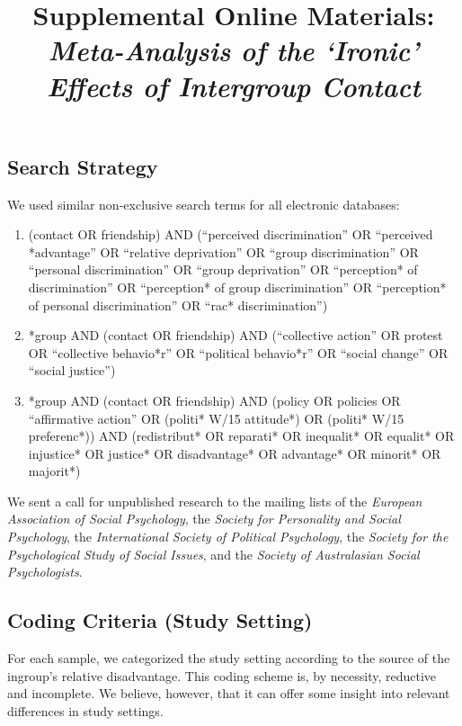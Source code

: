 \documentclass[12pt, letterpaper]{article}
\title{ Supplemental Online Materials:\\\textit{Meta-Analysis of the
`Ironic' Effects of Intergroup Contact} }
\author{  }
\begin{document}
\maketitle

\hypertarget{search-strategy}{%
\subsection{Search Strategy}\label{search-strategy}}

We used similar non-exclusive search terms for all electronic databases:

\begin{enumerate}
\def\labelenumi{\arabic{enumi}.}
\item
  (contact OR friendship) AND (``perceived discrimination'' OR
  ``perceived *advantage'' OR ``relative deprivation'' OR ``group
  discrimination'' OR ``personal discrimination'' OR ``group
  deprivation'' OR ``perception* of discrimination'' OR ``perception* of
  group discrimination'' OR ``perception* of personal discrimination''
  OR ``rac* discrimination'')
\item
  *group AND (contact OR friendship) AND (``collective action'' OR
  protest OR ``collective behavio*r'' OR ``political behavio*r'' OR
  ``social change'' OR ``social justice'')
\item
  *group AND (contact OR friendship) AND (policy OR policies OR
  ``affirmative action'' OR (politi* W/15 attitude*) OR (politi* W/15
  preferenc*)) AND (redistribut* OR reparati* OR inequalit* OR equalit*
  OR injustice* OR justice* OR disadvantage* OR advantage* OR minorit*
  OR majorit*)
\end{enumerate}

\noindent We sent a call for unpublished research to the mailing lists
of the \emph{European Association of Social Psychology}, the
\emph{Society for Personality and Social Psychology}, the
\emph{International Society of Political Psychology}, the \emph{Society
for the Psychological Study of Social Issues}, and the \emph{Society of
Australasian Social Psychologists}.

\hypertarget{coding-criteria-study-setting}{%
\subsection{Coding Criteria (Study
Setting)}\label{coding-criteria-study-setting}}

For each sample, we categorized the study setting according to the
source of the ingroup's relative disadvantage. This coding scheme is, by
necessity, reductive and incomplete. We believe, however, that it can
offer some insight into relevant differences in study settings.
\end{document}

